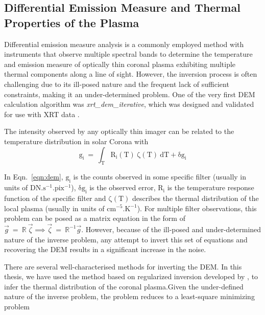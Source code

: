 \subsection{Differential Emission Measure and Thermal Properties of the Plasma}\label{sec:c2_dem}

Differential emission measure analysis is a commonly employed method with instruments that observe multiple spectral bands to determine the temperature and emission measure of optically thin coronal plasma exhibiting multiple thermal components along a line of sight. However, the inversion process is often challenging due to its ill-posed nature and the frequent lack of sufficient constraints, making it an under-determined problem. One of the very first DEM calculation algorithm was {\it xrt\_dem\_iterative}, which was designed and validated for use with XRT data \citep{golub04,weber04}.

The intensity observed by any optically thin imager can be related to the temperature distribution in solar Corona with 
\begin{equation}
    \mathrm{g_{i}~=~\int_{T}R_{i}(T)~\zeta(T)~dT+\delta g_{i}}
    \label{eqn:dem}
\end{equation}

In Eqn.~\ref{eqn:dem}, $\mathrm{g_{i}}$ is the counts observed in some specific filter (usually in units of $\mathrm{DN.s^{-1}.pix^{-1}}$), $\mathrm{\delta g_{i}}$ is the observed error, $\mathrm{R_{i}}$ is the temperature response function of the specific filter and {\bf $\mathrm{\zeta(T)}$} describes the thermal distribution of the local plasma  (usually in units of $\mathrm{cm^{-5}.K^{-1}}$). For multiple filter observations, this problem can be posed as a matrix equation in the form of $\Vec{g}~=~\mathbb{R}~\Vec{\zeta}\implies \Vec{\zeta}~=~\mathbb{R}^{-1}\Vec{g}$. However, because of the ill-posed and under-determined nature of the inverse problem, any attempt to invert this set of equations and recovering the DEM results in a significant increase in the noise.

There are several well-characterised methods for inverting the DEM. In this thesis, we have used the method based on regularized inversion developed by \cite{hannah&kontar12}, to infer the thermal distribution of the coronal plasma.Given the under-defined nature of the inverse problem, the problem reduces to a least-square minimizing problem

